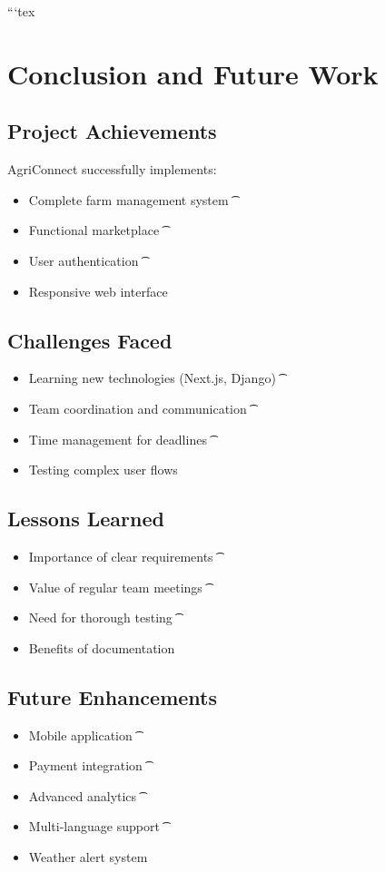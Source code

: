 ```tex
\section{Conclusion and Future Work}

\subsection{Project Achievements}
AgriConnect successfully implements:
\begin{itemize}[leftmargin=*]
\t\item Complete farm management system
\t\item Functional marketplace
\t\item User authentication
\t\item Responsive web interface
\end{itemize}

\subsection{Challenges Faced}
\begin{itemize}[leftmargin=*]
\t\item Learning new technologies (Next.js, Django)
\t\item Team coordination and communication
\t\item Time management for deadlines
\t\item Testing complex user flows
\end{itemize}

\subsection{Lessons Learned}
\begin{itemize}[leftmargin=*]
\t\item Importance of clear requirements
\t\item Value of regular team meetings
\t\item Need for thorough testing
\t\item Benefits of documentation
\end{itemize}

\subsection{Future Enhancements}
\begin{itemize}[leftmargin=*]
\t\item Mobile application
\t\item Payment integration
\t\item Advanced analytics
\t\item Multi-language support
\t\item Weather alert system
\end{itemize}

